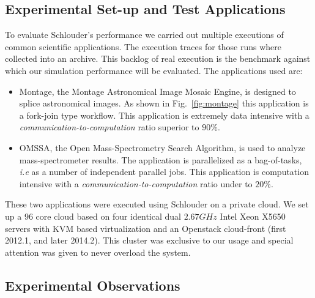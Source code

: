 \documentclass[10pt,conference,compsocconf]{IEEEtran}
\begin{document}
\subsection{Experimental Set-up and Test Applications}\label{sc:setup}

To evaluate Schlouder's performance we carried out multiple executions of
common scientific applications. The execution traces for those runs where
collected into an archive. This backlog of real execution is the benchmark
against which our simulation performance will be evaluated. The applications
used are:

\begin{itemize}
	\item Montage\cite{montage2009}, the Montage Astronomical Image Mosaic
		Engine, is designed to splice astronomical images. As shown in
		Fig.~\ref{fig:montage} this application is a fork-join type
		workflow. This application is extremely data intensive with a
		\emph{communication-to-computation} ratio superior to $90\%$.
	\item OMSSA\cite{Geer2004}, the Open Mass-Spectrometry Search Algorithm, 
		is used to analyze mass-spectrometer results. The application is
                parallelized as a bag-of-tasks, \textit{i.e} as a number of
                independent parallel jobs. This application is
		computation intensive with a
		\emph{communication-to-computation} ratio under to $20\%$.
\end{itemize}

These two applications were executed using Schlouder on a private cloud.  We set
up a 96 core cloud based on four identical  dual $2.67GHz$ Intel Xeon X5650
servers with KVM based virtualization  and an Openstack cloud-front (first
2012.1, and later 2014.2). This cluster was exclusive to our usage and special
attention was given to never overload the system.

\subsection{Experimental Observations}
\end{document}
